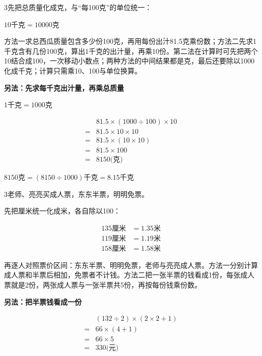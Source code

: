 \documentclass[multi=snippet,border={5bp 20bp 5bp 5bp}]{standalone}
\newenvironment{snippet}[3]{\begin{minipage}{#1bp}\color{answerred}\fontsize{#2}{#3}\selectfont\raggedright}{\end{minipage}}
\begin{document}
\begin{snippet}{505}{11.5}{14}\begin{multicols}{3}\raggedcolumns 先把总质量化成克，与“每100克”的单位统一：\par\noindent\(\displaystyle 10\text{千克}=10000\text{克}\)\allowbreak \par 方法一求总西瓜质量包含多少份100克，再用每份出汁81.5克乘份数；方法二先求1千克含有几份100克，算出1千克的出汁量，再乘10份。第二法在计算时可先把两个10结合成100，一次移动小数点；两种方法的中间结果都是克，最后还要除以1000化成千克；计算只需乘10、100与单位换算。\par \textbf{另法：先求每千克出汁量，再乘总质量}\par \noindent\(\displaystyle 1\text{千克}=1000\text{克}\)\allowbreak \par \noindent\[\displaystyle \begin{aligned}&81.5\times(1000\div100)\times10\\={}&81.5\times10\times10\\={}&81.5\times(10\times10)\\={}&81.5\times100\\={}&8150\text{(克)}\end{aligned}\]\par \noindent\(\displaystyle 8150\text{克}=(8150\div1000)\text{千克}=8.15\text{千克}\)\allowbreak \par\end{multicols}\end{snippet}
\begin{snippet}{505}{11.5}{14}\begin{multicols}{3}\raggedcolumns 老师、亮亮买成人票，东东半票，明明免票。\par 先把厘米统一化成米，各自除以100：\par\noindent\[\displaystyle \begin{aligned}135\text{厘米}&=1.35\text{米}\\119\text{厘米}&=1.19\text{米}\\158\text{厘米}&=1.58\text{米}\end{aligned}\]\par 再逐人对照票价区间：东东半票、明明免票，老师与亮亮成人票。方法一分别计算成人票和半票后相加，免票者不计钱。方法二把一张半票的钱看成1份，每张成人票就是2份，两张成人票与一张半票共5份，再按每份钱乘份数。\par \textbf{另法：把半票钱看成一份}\par \noindent\[\displaystyle \begin{aligned}&(132\div2)\times(2\times2+1)\\={}&66\times(4+1)\\={}&66\times5\\={}&330\text{(元)}\end{aligned}\]\par\end{multicols}\end{snippet}
\end{document}
